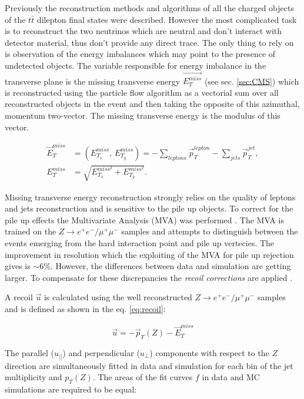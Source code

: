Previously the reconstruction methods and algorithms of all the charged objects of the $t\bar{t}$ dilepton final states were described. However the most complicated 
task is to reconstruct the two neutrinos which are neutral and don't interact with detector material, thus don't provide any direct trace. The only thing to rely on is
observation of the energy imbalances which may point to the presence of undetected objects. The variable responsible for energy imbalance in the transverse plane is 
the missing transverse energy $\vec{E^{miss}_{T}}$ (see sec. \ref{sec:CMS}) which is reconstructed using the particle flow algorithm \cite{CMS-PAS-PFT-09-001}
as a vectorial sum over all reconstructed objects in the event and then taking the opposite of this azimuthal, momentum two-vector. The missing transverse energy is the modulus
of this vector.

\begin{align}
 \vec{E}_{T}^{miss} & = (E_{T_{x}}^{miss}, \, E_{T_{y}}^{miss}) = - \sum_{leptons} \vec{p}_{T}^{lepton} - \sum_{jets} \vec{p}_{T}^{jet}, \\
 E_{T}^{miss} & = \sqrt{E_{T_{x}}^{miss^{2}} + E_{T_{y}}^{miss^{2}}}.
\end{align}

Missing transverse energy reconstruction strongly relies on the quality of leptons and jets reconstruction and is sensitive to the pile up objects. To correct for the 
pile up effects the Multivariate Analysis (MVA) was performed \cite{CMS-PAS-JME-12-002}.
The MVA is trained on the $Z \to e^{+}e^{-} / \mu^{+}\mu^{-}$ samples and attempts to distinguish between the events emerging from the hard interaction point and
pile up vertecies. The improvement in resolution which the exploiting of the MVA for pile up rejection gives is $\sim 6\%$. However, the differences between data
and simulation are getting larger. To compensate for these discrepancies the \textit{recoil corrections} are applied \cite{CMS-PAS-JME-12-002}. 

A recoil $\vec{u}$ is calculated using the well reconstructed $Z \to e^{+}e^{-} / \mu^{+}\mu^{-}$ samples and is defined as shown in the eq. \ref{eq:recoil}:

\begin{equation}
 \vec{u} = - \vec{p}_{T}(Z) - \vec{E}_{T}^{miss}
\end{equation}

The parallel ($u_{||}$) and perpendicular ($u_{\perp}$) components with respect to the $Z$ direction are simultaneously fitted in data and simulation for each bin
of the jet multiplicity and $p_{T}(Z)$. The areas of the fit curves $f$ in data and MC simulations are required to be equal:

